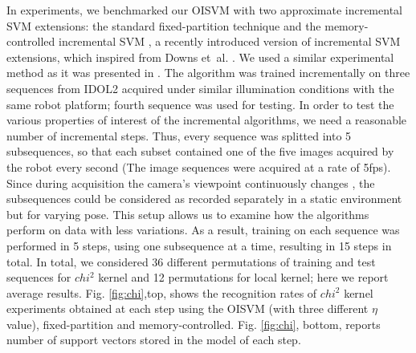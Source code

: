 In experiments, we benchmarked our OISVM with two approximate incremental SVM extensions:
the standard fixed-partition technique \cite{ijcai99} and the memory-controlled incremental
SVM \cite{luo:icra07}, a recently introduced version of incremental SVM
extensions, which inspired from Downs et~al. \cite{DownsGM01}. We used a similar experimental
method as it was presented in \cite{luo:icra07}. The algorithm was trained incrementally on
three sequences from IDOL2 acquired under similar illumination conditions with the same robot
platform; fourth sequence was used for testing. In order to test the various properties of
interest of the incremental algorithms, we need a reasonable number of incremental steps.
Thus, every sequence was splitted into 5 subsequences, so that each subset contained one of the
five images acquired by the robot every second (The image sequences were acquired at a rate of
5fps). Since during acquisition the camera's viewpoint continuously changes \cite{luo:icra07},
the subsequences could be considered as recorded separately in a static environment but for
varying pose. This setup allows us to examine how the algorithms perform on data with less
variations. As a result, training on each sequence was performed in 5 steps, using one subsequence
at a time, resulting in 15 steps in total. In total, we considered 36 different permutations
of training and test sequences for $chi^2$ kernel and 12 permutations for local kernel; here
we report average results. Fig. \ref{fig:chi},top, shows the recognition rates of $chi^2$ kernel experiments
obtained at each step using the OISVM (with three different $\eta$ value), fixed-partition and
memory-controlled. Fig. \ref{fig:chi}, bottom, reports number of support vectors stored in the model of
each step.

